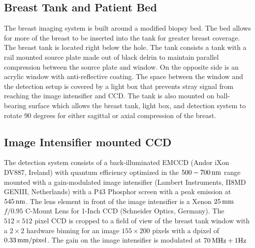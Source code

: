 \subsection{Breast Tank and Patient Bed}
The breast imaging system is built around a modified biopsy bed. The bed allows for more of the breast to be inserted into the tank for greater breast coverage. The breast tank is located right below the hole. The tank consists a tank with a rail mounted source plate made out of black delrin to maintain parallel compression between the source plate and window. On the opposite side is an acrylic window with anti-reflective coating. The space between the window and the detection setup is covered by a light box that prevents stray signal from reaching the image intensifier and CCD. The tank is also mounted on ball-bearing surface which allows the breast tank, light box, and detection system to rotate 90 degrees for either sagittal or axial compression of the breast.


\subsection{Image Intensifier mounted CCD}
The detection system consists of a back-illuminated EMCCD (Andor iXon DV887, Ireland) with quantum efficiency optimized in the $500-700\,{\rm nm}$ range mounted with a gain-modulated image intensifier (Lambert Instruments, II8MD GENIII, Netherlands) with a P43 Phosphor screen with a peak emission at $545\, {\rm nm}$. The lens element in front of the image intensifier is a Xenon $25\,{\rm mm}$ $f/0.95$ C-Mount Lens for 1-Inch CCD (Schneider Optics, Germany). The $512 \times 512$ pixel CCD is cropped to a field of view of the breast tank window with a $2 \times 2$ hardware binning for an image $155 \times 200$ pixels with a dpixel of $0.33\, {\rm mm/pixel}$. The gain on the image intensifier is modulated at  $70\,{\rm MHz} + 1 {\rm Hz}$

